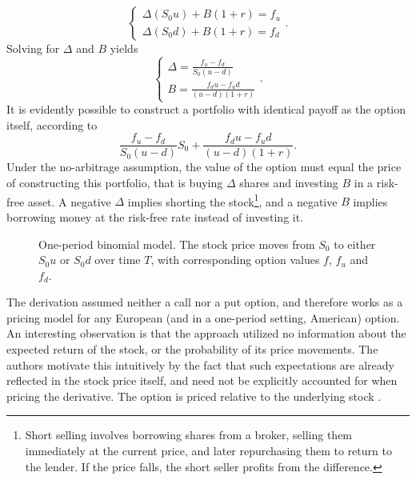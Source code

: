 \documentclass[english,12pt,a4paper,pdftex,sci,utf8]{aaltothesis}
\begin{document}
\begin{equation*}
\begin{cases}
    \Delta (S_0u) + B(1+r) = f_u\\
    \Delta (S_0d) + B(1+r) = f_d
\end{cases}.
\end{equation*}
Solving for $\Delta$ and $B$ yields
\begin{equation*}
\begin{cases}
    \Delta = \frac{f_u - f_d}{S_0(u-d)}\\
    B = \frac{f_du-f_ud}{(u-d)(1+r)}
\end{cases}.
\end{equation*}
It is evidently possible to construct a portfolio with identical payoff as the option itself, according to
\begin{equation}
     \frac{f_u - f_d}{S_0(u-d)} S_0 + \frac{f_du-f_ud}{(u-d)(1+r)}
\label{eq:replicating-portfolio}.
\end{equation}
Under the no-arbitrage assumption, the value of the option must equal the price of constructing this portfolio, that is buying $\Delta$ shares and investing $B$ in a risk-free asset. A negative $\Delta$ implies shorting the stock\footnote{Short selling involves borrowing shares from a broker, selling them immediately at the current price, and later repurchasing them to return to the lender. If the price falls, the short seller profits from the difference.}, and a negative $B$ implies borrowing money at the risk-free rate instead of investing it.
\begin{figure}[htbp]
    \centering
    \caption{One-period binomial model. The stock price moves from $S_0$ to either $S_0u$ or $S_0d$ over time $T$, with corresponding option values $f$, $f_u$ and $f_d$.}
    \label{fig:oneperiodbinom}
\end{figure}
The derivation assumed neither a call nor a put option, and therefore works as a pricing model for any European (and in a one-period setting, American) option. An interesting observation is that the approach utilized no information about the expected return of the stock, or the probability of its price movements. The authors motivate this intuitively by the fact that such expectations are already reflected in the stock price itself, and need not be explicitly accounted for when pricing the derivative. The option is priced relative to the underlying stock \cite{hull2016options}.\clearpage
\end{document}

